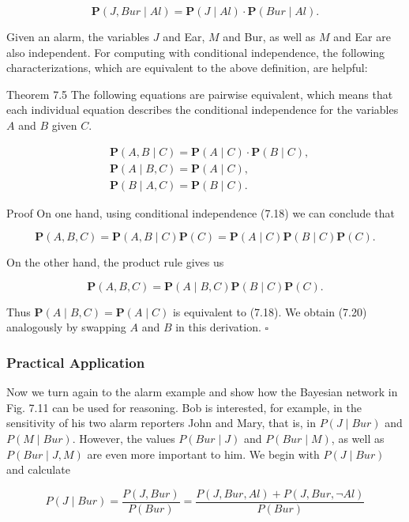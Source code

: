 \documentclass[10pt]{article}
\begin{document}
$$
\boldsymbol{P}(J, B u r \mid A l)=\boldsymbol{P}(J \mid A l) \cdot \boldsymbol{P}(B u r \mid A l) .
$$

Given an alarm, the variables $J$ and Ear, $M$ and Bur, as well as $M$ and Ear are also independent. For computing with conditional independence, the following characterizations, which are equivalent to the above definition, are helpful:

Theorem 7.5 The following equations are pairwise equivalent, which means that each individual equation describes the conditional independence for the variables $A$ and $B$ given $C$.


\begin{align*}
& \boldsymbol{P}(A, B \mid C)=\boldsymbol{P}(A \mid C) \cdot \boldsymbol{P}(B \mid C),  \tag{7.18}\\
& \boldsymbol{P}(A \mid B, C)=\boldsymbol{P}(A \mid C),  \tag{7.19}\\
& \boldsymbol{P}(B \mid A, C)=\boldsymbol{P}(B \mid C) . \tag{7.20}
\end{align*}


Proof On one hand, using conditional independence (7.18) we can conclude that

$$
\boldsymbol{P}(A, B, C)=\boldsymbol{P}(A, B \mid C) \boldsymbol{P}(C)=\boldsymbol{P}(A \mid C) \boldsymbol{P}(B \mid C) \boldsymbol{P}(C) .
$$

On the other hand, the product rule gives us

$$
\boldsymbol{P}(A, B, C)=\boldsymbol{P}(A \mid B, C) \boldsymbol{P}(B \mid C) \boldsymbol{P}(C) .
$$

Thus $\boldsymbol{P}(A \mid B, C)=\boldsymbol{P}(A \mid C)$ is equivalent to (7.18). We obtain (7.20) analogously by swapping $A$ and $B$ in this derivation. \(\square\)

\subsubsection*{Practical Application}
Now we turn again to the alarm example and show how the Bayesian network in Fig. 7.11 can be used for reasoning. Bob is interested, for example, in the sensitivity of his two alarm reporters John and Mary, that is, in $P(J \mid B u r)$ and $P(M \mid B u r)$. However, the values $P(B u r \mid J)$ and $P(B u r \mid M)$, as well as $P(B u r \mid J, M)$ are even more important to him. We begin with $P(J \mid B u r)$ and calculate


\begin{equation*}
P(J \mid B u r)=\frac{P(J, B u r)}{P(B u r)}=\frac{P(J, B u r, A l)+P(J, B u r, \neg A l)}{P(B u r)} \tag{7.21}
\end{equation*}
\end{document}
